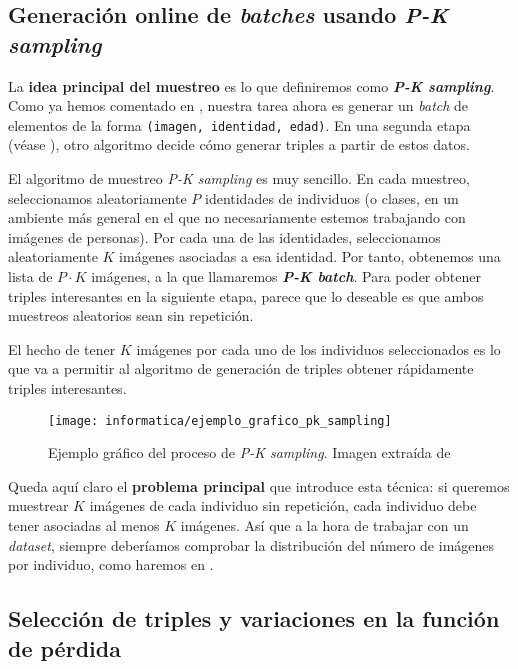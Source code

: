 \subsection{Generación online de \textit{batches} usando \textit{P-K sampling}} \label{isubs:muestreo_datos_pk_sampling_teoria}

La \textbf{idea principal del muestreo} es lo que definiremos como \textbf{\textit{P-K sampling}}. Como ya hemos comentado en , nuestra tarea ahora es generar un \textit{batch} de elementos de la forma \lstinline{(imagen, identidad, edad)}. En una segunda etapa (véase ), otro algoritmo decide cómo generar triples a partir de estos datos.

El algoritmo de muestreo \textit{P-K sampling} es muy sencillo. En cada muestreo, seleccionamos aleatoriamente $P$ identidades de individuos (o clases, en un ambiente más general en el que no necesariamente estemos trabajando con imágenes de personas). Por cada una de las identidades, seleccionamos aleatoriamente $K$ imágenes asociadas a esa identidad. Por tanto, obtenemos una lista de $P \cdot K$ imágenes, a la que llamaremos \textbf{\textit{P-K batch}}. Para poder obtener triples interesantes en la siguiente etapa, parece que lo deseable es que ambos muestreos aleatorios sean sin repetición.

El hecho de tener $K$ imágenes por cada uno de los individuos seleccionados es lo que va a permitir al algoritmo de generación de triples obtener rápidamente triples interesantes.

\begin{figure}[!hbtp]
    \centering
    \texttt{[image: informatica/ejemplo\_grafico\_pk\_sampling]}
    \caption{Ejemplo gráfico del proceso de \textit{P-K sampling}. Imagen extraída de \cite{informatica:paper_image_pk_sampling}}
\end{figure}

Queda aquí claro el \textbf{problema principal} que introduce esta técnica: si queremos muestrear $K$ imágenes de cada individuo sin repetición, cada individuo debe tener asociadas al menos $K$ imágenes. Así que a la hora de trabajar con un \textit{dataset}, siempre deberíamos comprobar la distribución del número de imágenes por individuo, como haremos en .

\subsection{Selección de triples y variaciones en la función de pérdida} \label{isubs:seleccion_de_triples}

